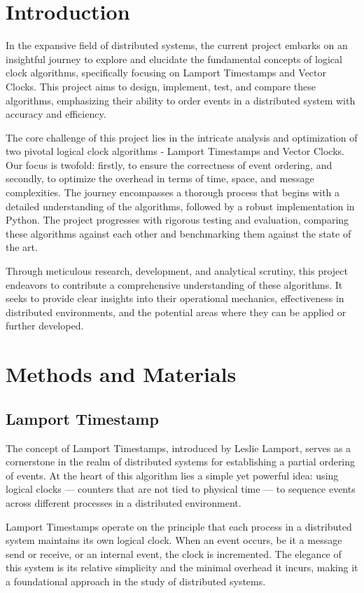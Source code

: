 \documentclass{article}
\begin{document}

\tableofcontents
\section{Introduction}
    In the expansive field of distributed systems, the current project embarks on an insightful journey to explore and elucidate the fundamental concepts of logical clock algorithms, specifically focusing on Lamport Timestamps and Vector Clocks. This project aims to design, implement, test, and compare these algorithms, emphasizing their ability to order events in a distributed system with accuracy and efficiency. 

    The core challenge of this project lies in the intricate analysis and optimization of two pivotal logical clock algorithms - Lamport Timestamps and Vector Clocks. Our focus is twofold: firstly, to ensure the correctness of event ordering, and secondly, to optimize the overhead in terms of time, space, and message complexities. The journey encompasses a thorough process that begins with a detailed understanding of the algorithms, followed by a robust implementation in Python. The project progresses with rigorous testing and evaluation, comparing these algorithms against each other and benchmarking them against the state of the art.

    Through meticulous research, development, and analytical scrutiny, this project endeavors to contribute a comprehensive understanding of these algorithms. It seeks to provide clear insights into their operational mechanics, effectiveness in distributed environments, and the potential areas where they can be applied or further developed.


\section{Methods and Materials}
\subsection{Lamport Timestamp}
  The concept of Lamport Timestamps, introduced by Leslie Lamport\cite{Lamport:1978}, serves as a cornerstone in the realm of distributed systems for establishing a partial ordering of events. At the heart of this algorithm lies a simple yet powerful idea: using logical clocks — counters that are not tied to physical time — to sequence events across different processes in a distributed environment.

  Lamport Timestamps operate on the principle that each process in a distributed system maintains its own logical clock. When an event occurs, be it a message send or receive, or an internal event, the clock is incremented. The elegance of this system is its relative simplicity and the minimal overhead it incurs, making it a foundational approach in the study of distributed systems.
\end{document}
